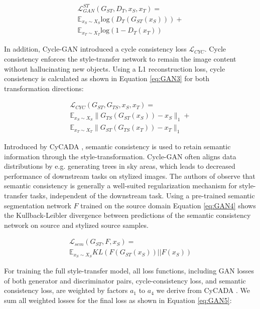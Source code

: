\documentclass[10pt,twocolumn,letterpaper]{article}
\begin{document}
\begin{multline}
	\label{eq:GAN1}
	\mathcal{L}_{GAN}^{ST}(G_{ST}, D_T, x_S, x_T) = \\
	\mathbb{E}_{x_S \sim X_S} \mbox{log}(D_{T}(G_{ST}(x_S))) + \\
	\mathbb{E}_{x_T \sim X_T} \mbox{log}(1 - D_{T}(x_T))
\end{multline}

In addition, Cycle-GAN \cite{CycleGAN} introduced a cycle consistency loss $\mathcal{L}_{CYC}$. Cycle consistency enforces the style-transfer network to remain the image content without hallucinating new objects. Using a L1 reconstruction loss, cycle consistency is calculated as shown in Equation \ref{eq:GAN3} for both transformation directions:

\begin{multline}
	\label{eq:GAN3}
	\mathcal{L}_{CYC}(G_{ST}, G_{TS}, x_S, x_T) = \\
	\mathbb{E}_{x_S \sim X_S} \| G_{TS}(G_{ST}(x_S)) - x_S\|_1 + \\
	\mathbb{E}_{x_T \sim X_T} \| G_{ST}(G_{TS}(x_T)) - x_T\|_1
\end{multline}

Introduced by CyCADA \cite{CyCADA}, semantic consistency is used to retain semantic information through the style-transformation. Cycle-GAN often aligns data distributions by e.g. generating trees in sky areas, which leads to decreased performance of downstream tasks on stylized images. The authors of \cite{menke2022} observe that semantic consistency is generally a well-suited regularization mechanism for style-transfer tasks, independent of the downstream task. Using a pre-trained semantic segmentation network $F$ trained on the source domain Equation \ref{eq:GAN4} shows the Kullback-Leibler divergence between predictions of the semantic consistency network on source and stylized source samples. 

\begin{multline}
	\label{eq:GAN4}
	\mathcal{L}_{sem}(G_{ST}, F, x_S) = \\
	\mathbb{E}_{x_S \sim X_S} KL(F(G_{ST}(x_S))||F(x_S))
\end{multline}

For training the full style-transfer model, all loss functions, including GAN losses of both generator and discriminator pairs, cycle-consistency loss, and semantic consistency loss, are weighted by factors $a_1$ to $a_4$ we derive from CyCADA \cite{CyCADA}. We sum all weighted losses for the final loss as shown in Equation \ref{eq:GAN5}:
\end{document}
